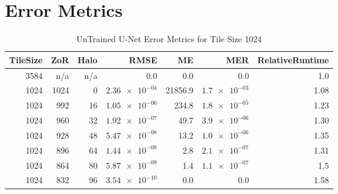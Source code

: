 \documentclass[10pt, indentfirst]{article}
\begin{document}
\section{Error Metrics}

\begin{table}[h!]
	\centering
	\caption{UnTrained U-Net Error Metrics for Tile Size 1024}
	\label{tab:tile_size_1024}
	\begin{tabular}{r|r|r|r|r|r|r}
		TileSize & ZoR & Halo & RMSE    & ME & MER & RelativeRuntime \\ 
		\hline
		3584 & n/a & n/a & 0.0 & 0.0 & 0.0 & 1.0 \\
		1024 & 1024 & 0 & $\num{2.36e-04}$ & 21856.9 & $\num{1.7e-03}$ & 1.08 \\
		1024 & 992 & 16 & $\num{1.05e-06}$ & 234.8 & $\num{1.8e-05}$ & 1.23 \\
		1024 & 960 & 32 & $\num{1.92e-07}$ & 49.7 & $\num{3.9e-06}$ & 1.30 \\
		1024 & 928 & 48 & $\num{5.47e-08}$ & 13.2 & $\num{1.0e-06}$ & 1.35 \\
		1024 & 896 & 64 & $\num{1.44e-08}$ & 2.8 & $\num{2.1e-07}$ & 1.31 \\
		1024 & 864 & 80 & $\num{5.87e-09}$ & 1.4 & $\num{1.1e-07}$ & 1.5 \\
		1024 & 832 & 96 & $\num{3.54e-10}$ & 0.0 & 0.0 & 1.58 \\
	\end{tabular}
\end{table}
\end{document}
